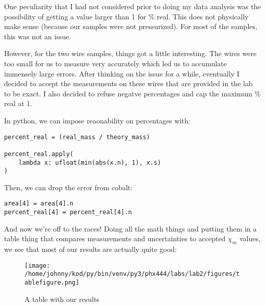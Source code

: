 \documentclass{article}
\begin{document}
One peculiarity that I had not considered prior to doing my data analysis was
the possibility of getting a value larger than 1 for \% real. This does not
physically make sense (because our samples were not pressurized). For most of the
samples, this was not an issue. 

However, for the two wire samples, things got a little
interesting. The wires were too small for us to measure very accurately which
led us to accumulate immensely large errors.  After thinking on the issue for a
while, eventually I decided to accept the measurements on these wires that are
provided in the lab to be exact. I also decided to refuse negatve percentages
and cap the maximum \% real at 1. 

In python, we can impose reaonability on percentages with: 

\begin{center}
\begin{minipage}[t]{.75\textwidth}
\begin{lstlisting}[frame=tlrb]
percent_real = (real_mass / theory_mass)

percent_real.apply(
    lambda x: ufloat(min(abs(x.n), 1), x.s)
)
\end{lstlisting}
\end{minipage}
\end{center}

Then, we can drop the error from cobalt:

\begin{center}
\begin{minipage}[t]{.75\textwidth}
\begin{lstlisting}[frame=tlrb]
area[4] = area[4].n
percent_real[4] = percent_real[4].n
\end{lstlisting}
\end{minipage}
\end{center}

And now we're off to the races! Doing all the math things and putting them in a
table thing that compares measurements and uncertainties to accepted $\chi_m$
values, we see that most of our results are actually quite good:

\begin{figure}[H]
        \begin{center}
        \texttt{[image: /home/johnny/kod/py/bin/venv/py3/phx444/labs/lab2/figures/tablefigure.png]}
        \caption{A table with our results}
        \label{fig:fig_4}
        \end{center}
\end{figure}
\end{document}
